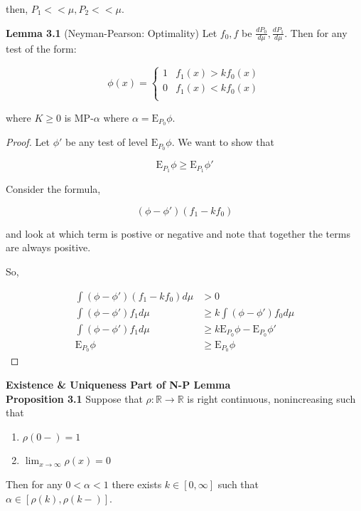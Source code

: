 \documentclass[11pt,fleqn]{book} %
\newcommand{\E}{\mathrm{E}}
\begin{document}
	then, $P_1 << \mu, P_2 << \mu$.

\textbf{Lemma 3.1} (Neyman-Pearson: Optimality) Let $f_0, f$ be $\frac{d P_0}{d \mu}, \frac{d P_1}{d \mu}$. Then for any test of the form: 

		$$ \phi(x) = \left\{ \begin{array}{ll}
			1 & f_1(x) > k f_0(x)\\
			0 & f_1(x) < k f_0(x)\\
		\end{array} \right.$$

where $K \geq 0$ is MP-$\alpha$ where $\alpha = \E_{P_0} \phi$.


\begin{proof}
	Let $\phi'$ be any test of level $\E_{P_0} \phi$. We want to show that

			$$\E_{P_1} \phi \geq \E_{P_1} \phi' $$

	Consider the formula, 

			$$(\phi - \phi')(f_1 - k f_0) $$

	and look at which term is postive or negative and note that together the terms are always positive. 

	So, 

			\begin{align*}
				\int (\phi - \phi')(f_1 - k f_0) d\mu &> 0\\
				\int (\phi - \phi')f_1 d\mu &\geq k \int (\phi - \phi')f_0 d\mu\\
				\int (\phi - \phi') f_1 d\mu &\geq k \E_{P_0} \phi - \E_{P_0} \phi'\\
				\E_{P_0} \phi &\geq \E_{P_0} \phi
			\end{align*}

\end{proof}

\textbf{Existence \& Uniqueness Part of N-P Lemma}\\

\textbf{Proposition 3.1} Suppose that $\rho:\mathbb{R} \rightarrow \mathbb{R}$ is right continuous, nonincreasing such that

		\begin{enumerate}
			 \item $\rho(0-) = 1$
			 \item  $\lim_{x \rightarrow \infty} \rho(x) = 0$
		\end{enumerate}

Then for any $0 < \alpha < 1$ there exists $k \in [0, \infty]$ such that $\alpha \in [\rho(k), \rho(k-)]$. 
\end{document}
